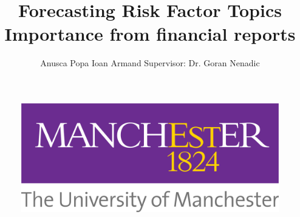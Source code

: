 \documentclass[12pt,MSc,a4paper,oneside]{muthesis}
\newcommand{\detailtexcount}[1]{%
  \immediate\write18{texcount -merge -sum #1.tex > #1.wcdetail }%
}
\newcommand{\quickwordcount}[1]{%
  \immediate\write18{texcount -1 -sum -merge #1.tex > #1-words.sum }%
   words%
}
\newcommand{\quickcharcount}[1]{%
  \immediate\write18{texcount -1 -sum -merge -char #1.tex > #1-chars.sum }%
   characters (not including spaces)%
}
\begin{document}
\begin{figure}[t]
\centering
\includegraphics[scale=0.1]{images/uom.png}
\end{figure}

\title{Forecasting Risk Factor Topics
Importance from financial reports}
\author{
Anusca Popa Ioan Armand 
\newline
Supervisor: Dr. Goran Nenadic
}

\def\wordcount{\quickwordcount{main}}





 
\beforeabstract
\end{document}
